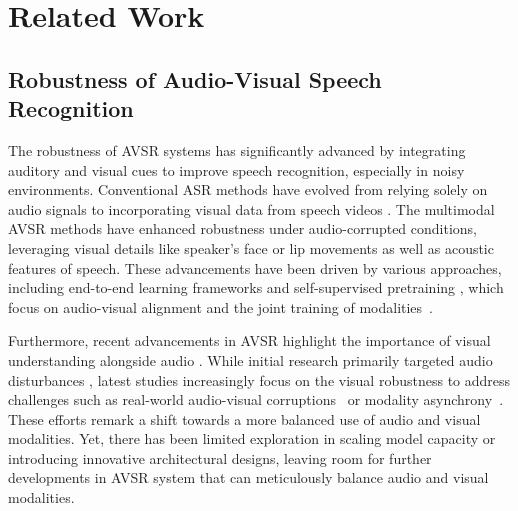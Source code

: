 \section{Related Work}
\label{sec:related_work}

\subsection{Robustness of Audio-Visual Speech Recognition} 

The robustness of AVSR systems has significantly advanced by integrating auditory and visual cues to improve speech recognition, especially in noisy environments. Conventional ASR methods have evolved from relying solely on audio signals \cite{schneider2019wav2vec, gulati2020conformer, baevski2020wav2vec, hsu2021hubert, chen2022wavlm, chiu2022self, radford2023robust} to incorporating visual data from speech videos \citep{makino2019recurrent}.
The multimodal AVSR methods \citep{pan2022leveraging, shi2022learning, seo2023avformer, ma2023auto} have enhanced robustness under audio-corrupted conditions, leveraging visual details like speaker's face or lip movements as well as acoustic features of speech. These advancements have been driven by various approaches, including end-to-end learning frameworks \citep{dupont2000audio, ma2021end, hong2022visual, burchi2023audio} and self-supervised pretraining \citep{ma2021lira, qu2022lipsound2, seo2023avformer, zhu2023vatlm, kim2025multitask}, which focus on audio-visual alignment and the joint training of modalities~\citep{zhang2023self, lian2023av, haliassos2022jointly, haliassos2024braven}.


Furthermore, recent advancements in AVSR highlight the importance of visual understanding alongside audio \citep{dai2024study, kim2024learning}. While initial research primarily targeted audio disturbances \citep{shi2022robust, hu2023hearing, hu2023cross, chen2023leveraging}, latest studies increasingly focus on the visual robustness to address challenges such as real-world audio-visual corruptions~\citep{hong2023watch, wang2024restoring, kim2025multitask} or modality asynchrony~\citep{zhang2024visual, fu2024boosting, li2024unified}. These efforts remark a shift towards a more balanced use of audio and visual modalities. Yet, there has been limited exploration in scaling model capacity or introducing innovative architectural designs, leaving room for further developments in AVSR system that can meticulously balance audio and visual modalities.



